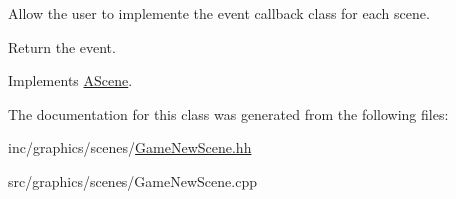 Allow the user to implemente the event callback class for each scene. 

Return the event. 

Implements \hyperlink{classAScene_af521e5e6d30a5d2e5d30eb333e4d3abd}{A\+Scene}.



The documentation for this class was generated from the following files\+:\begin{DoxyCompactItemize}
\item 
inc/graphics/scenes/\hyperlink{GameNewScene_8hh}{Game\+New\+Scene.\+hh}\item 
src/graphics/scenes/Game\+New\+Scene.\+cpp\end{DoxyCompactItemize}
